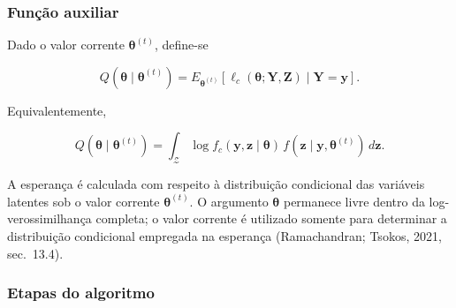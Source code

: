 \documentclass[
  letterpaper,
  DIV=11,
  numbers=noendperiod]{scrreprt}
\begin{document}
\subsubsection{Função auxiliar}\label{funuxe7uxe3o-auxiliar}

\begin{tcolorbox}[enhanced jigsaw, colback=white, leftrule=.75mm, colbacktitle=quarto-callout-important-color!10!white, breakable, titlerule=0mm, bottomtitle=1mm, title=\textcolor{quarto-callout-important-color}{\faExclamation}\hspace{0.5em}{Definição --- função \(Q\)}, colframe=quarto-callout-important-color-frame, toprule=.15mm, opacityback=0, bottomrule=.15mm, opacitybacktitle=0.6, arc=.35mm, toptitle=1mm, rightrule=.15mm, coltitle=black, left=2mm]

Dado o valor corrente \(\boldsymbol{\theta}^{(t)}\), define-se

\[Q(\boldsymbol{\theta}\mid\boldsymbol{\theta}^{(t)})
=
E_{\boldsymbol{\theta}^{(t)}}
\left[
\ell_c(\boldsymbol{\theta};\boldsymbol{Y},\boldsymbol{Z})
\mid
\boldsymbol{Y}=\boldsymbol{y}
\right].\]

Equivalentemente,

\[Q(\boldsymbol{\theta}\mid\boldsymbol{\theta}^{(t)})
=
\int_{\mathcal{Z}}
\log f_c(\boldsymbol{y},\boldsymbol{z}\mid\boldsymbol{\theta})
\,
 f(\boldsymbol{z}\mid\boldsymbol{y},\boldsymbol{\theta}^{(t)})
\,d\boldsymbol{z}.\]

\end{tcolorbox}

A esperança é calculada com respeito à distribuição condicional das
variáveis latentes sob o valor corrente \(\boldsymbol{\theta}^{(t)}\). O
argumento \(\boldsymbol{\theta}\) permanece livre dentro da
log-verossimilhança completa; o valor corrente é utilizado somente para
determinar a distribuição condicional empregada na esperança
(Ramachandran; Tsokos, 2021, sec.~13.4).

\subsubsection{Etapas do algoritmo}\label{etapas-do-algoritmo}
\end{document}
